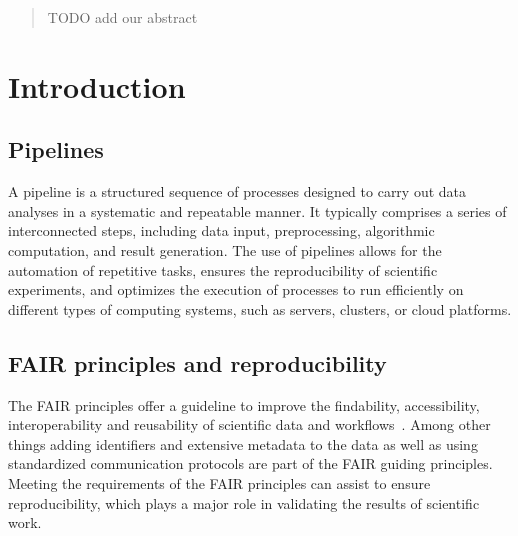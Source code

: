 \documentclass{article}
\theoremstyle{plain}
\theoremstyle{definition}
\theoremstyle{remark}
\begin{document}
\begin{abstract}
TODO add our abstract
\end{abstract}

%

\section{Introduction}
\subsection{Pipelines}
A pipeline is a structured sequence of processes designed to carry out data analyses in a systematic and repeatable manner. It typically comprises a series of interconnected steps, including data input, preprocessing, algorithmic computation, and result generation. The use of pipelines allows for the automation of repetitive tasks, ensures the reproducibility of scientific experiments, and optimizes the execution of processes to run efficiently on different types of computing systems, such as servers, clusters, or cloud platforms.
\subsection{FAIR principles and reproducibility}
The FAIR principles offer a guideline to improve the findability, accessibility, interoperability and reusability of scientific data and workflows~\cite{wilkinson2016fair}. 
Among other things adding identifiers and extensive metadata to the data as well as using standardized communication protocols are part of the FAIR guiding principles. Meeting the requirements of the FAIR principles can assist to ensure reproducibility, which plays a major role in validating the results of scientific work.
\end{document}
